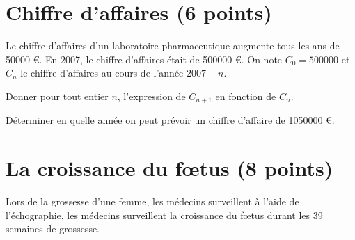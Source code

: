 \documentclass[a4paper,11pt]{exam}
\begin{document}
\section{Chiffre d'affaires (6 points)}

Le chiffre d'affaires d'un laboratoire pharmaceutique augmente tous les ans de \num{50000} €.
En 2007, le chiffre d'affaires était de \num{500000} €. On note $C_0 = \num{500000}$ et $C_n$ le chiffre d'affaires au cours de l'année $2007 + n$.

\begin{questions}
	\question[1] Donner pour tout entier $n$, l'expression de $C_{n+1}$ en fonction de $C_n$.
	\question[3] 
	
	\question[2] Déterminer en quelle année on peut prévoir un chiffre d'affaire de \num{1050000} €.
	
\end{questions}

\section{La croissance du f\oe tus (8 points)}

Lors de la grossesse d'une femme, les médecins surveillent à l'aide de l'échographie, les médecins surveillent la croissance du f\oe tus durant les 39 semaines de grossesse.
\end{document}
